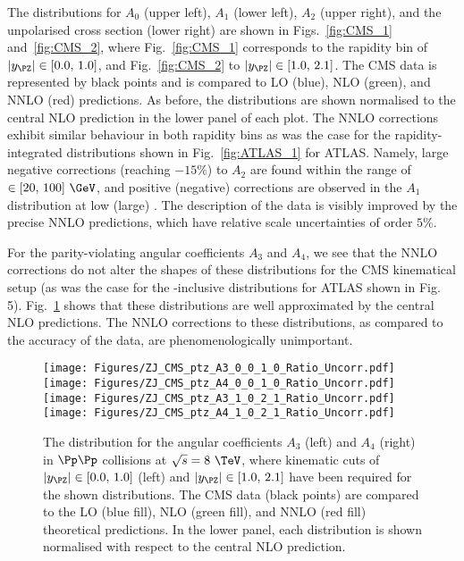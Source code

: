 The distributions for $A_0$ (upper left), $A_1$ (lower left), $A_2$ (upper right), and the unpolarised cross section (lower right) are shown in Figs.~\ref{fig:CMS_1} and~\ref{fig:CMS_2}, where Fig.~\ref{fig:CMS_1} corresponds to the rapidity bin of $\lvert\yz\rvert \in [0.0,\,1.0]$, and Fig.~\ref{fig:CMS_2} to $\lvert\yz\rvert \in [1.0,\,2.1]$. The CMS data is represented by black points
and is compared to LO (blue), NLO (green), and NNLO (red) predictions. As before, 
the distributions are shown normalised to the central NLO prediction in the lower panel of each plot.
%
The NNLO corrections exhibit similar behaviour in both rapidity bins as was the case for
the rapidity-integrated distributions shown in Fig.~\ref{fig:ATLAS_1} for ATLAS. Namely, large negative
corrections (reaching $-15\%$) to $A_2$ are found within the range of \ptz $\in[20,\,100]~\GeV$, 
and positive (negative) corrections are observed in the $A_1$ distribution at low (large) \ptz.
The description of the data is visibly improved by the precise NNLO predictions, which
have relative scale uncertainties of order $5\%$.

For the parity-violating angular coefficients $A_3$ and $A_4$, we see that the NNLO corrections do not alter the shapes of these distributions for the CMS kinematical setup (as was the case for the \yz-inclusive distributions for ATLAS shown in Fig. 5). Fig.~\ref{fig:CMS_3} shows that these distributions are well approximated by the central NLO predictions. The NNLO corrections to these distributions, as compared to the accuracy of the data, are phenomenologically unimportant.

\begin{figure}
\centering
\texttt{[image: Figures/ZJ\_CMS\_ptz\_A3\_0\_0\_1\_0\_Ratio\_Uncorr.pdf]} \hfill
\texttt{[image: Figures/ZJ\_CMS\_ptz\_A4\_0\_0\_1\_0\_Ratio\_Uncorr.pdf]} \\
\texttt{[image: Figures/ZJ\_CMS\_ptz\_A3\_1\_0\_2\_1\_Ratio\_Uncorr.pdf]} \hfill
\texttt{[image: Figures/ZJ\_CMS\_ptz\_A4\_1\_0\_2\_1\_Ratio\_Uncorr.pdf]}
\caption{
The \ptz distribution for the angular coefficients $A_3$ (left) and $A_4$ (right) 
in $\Pp\Pp$ collisions at $\sqrt{s} = 8~\TeV$, where kinematic cuts of $\lvert\yz\rvert \in [0.0,\,1.0]$ (left)
and $\lvert\yz\rvert \in [1.0,\,2.1]$ have been required for the shown distributions.
The CMS data (black points) are compared to the LO (blue fill), NLO (green fill), and NNLO (red fill) 
theoretical predictions. In the lower panel, each distribution is shown normalised 
with respect to the central NLO prediction. 
}
\label{fig:CMS_3}
\end{figure}


